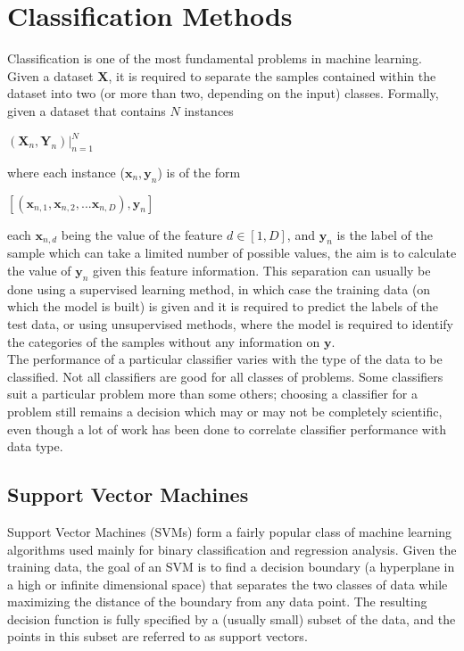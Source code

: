 \chapter{Classification Methods}
\label{chapter:Classification Methods}

Classification is one of the most fundamental problems in machine learning. Given a dataset $\mathbf{X}$, it is required to separate the samples contained within the dataset into two (or more than two, depending on the input) classes. Formally, given a dataset that contains $N$ instances

\begin{center}
    $(\mathbf{X}_{n}, \mathbf{Y}_n) |_{n = 1}^{N}$
\end{center}

where each instance ($\mathbf{x}_{n}, \mathbf{y}_{n}$) is of the form

\begin{center}
    $[(\mathbf{x}_{n, 1}, \mathbf{x}_{n, 2}, ... \mathbf{x}_{n, D}), \mathbf{y}_{n}]$
\end{center}

each $\mathbf{x}_{n, d}$ being the value of the feature $d \in [1, D]$, and $\mathbf{y}_{n}$ is the label of the sample which can take a limited number of possible values, the aim is to calculate the value of $\mathbf{y}_{n}$ given this feature information. This separation can usually be done using a supervised learning method, in which case the training data (on which the model is built) is given and it is required to predict the labels of the test data, or using unsupervised methods, where the model is required to identify the categories of the samples without any information on $\mathbf{y}$.\\

The performance of a particular classifier varies with the type of the data to be classified. Not all classifiers are good for all classes of problems. Some classifiers suit a particular problem more than some others; choosing a classifier for a problem still remains a decision which may or may not be completely scientific, even though a lot of work has been done to correlate classifier performance with data type.

\section{Support Vector Machines}
Support Vector Machines (SVMs) form a fairly popular class of machine learning algorithms used mainly for binary classification and regression analysis. Given the training data, the goal of an SVM is to find a decision boundary (a hyperplane in a high or infinite dimensional space) that separates the two classes of data while maximizing the distance of the boundary from any data point. The resulting decision function is fully specified by a (usually small) subset of the data, and the points in this subset are referred to as support vectors.\\

